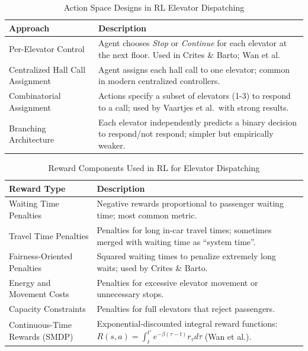 \documentclass[10pt,twocolumn]{article}
\begin{document}
\begin{table}[h!]
\centering
\caption{Action Space Designs in RL Elevator Dispatching}
\label{tab:action-space}
\begin{tabular}{|l|p{10cm}|}
\hline
\textbf{Approach} & \textbf{Description} \\
\hline
Per-Elevator Control &
Agent chooses \emph{Stop} or \emph{Continue} for each elevator at the next floor. Used in Crites \& Barto\cite{CRITES1995}; Wan et al\cite{WAN2024}. \\
\hline
Centralized Hall Call Assignment &
Agent assigns each hall call to one elevator; common in modern centralized controllers. \\
\hline
Combinatorial Assignment &
Actions specify a subset of elevators (1-3) to respond to a call; used by Vaartjes et al.\ with strong results\cite{VAARTJES2025}. \\
\hline
Branching Architecture &
Each elevator independently predicts a binary decision to respond/not respond; simpler but empirically weaker. \\
\hline
\end{tabular}
\end{table}

\begin{table}[h!]
\centering
\caption{Reward Components Used in RL for Elevator Dispatching}
\label{tab:reward-design}
\begin{tabular}{|l|p{10cm}|}
\hline
\textbf{Reward Type} & \textbf{Description} \\
\hline
Waiting Time Penalties &
Negative rewards proportional to passenger waiting time; most common metric. \\
\hline
Travel Time Penalties &
Penalties for long in-car travel times; sometimes merged with waiting time as ``system time''. \\
\hline
Fairness-Oriented Penalties &
Squared waiting times to penalize extremely long waits; used by Crites \& Barto. \\
\hline
Energy and Movement Costs &
Penalties for excessive elevator movement or unnecessary stops. \\
\hline
Capacity Constraints &
Penalties for full elevators that reject passengers. \\
\hline
Continuous-Time Rewards (SMDP) &
Exponential-discounted integral reward functions: 
$R(s,a) = \int_{t}^{t'} e^{-\beta(\tau - t)} r_\tau d\tau$ (Wan et al.\cite{WAN2024}). \\
\hline
\end{tabular}
\end{table}
\end{document}
